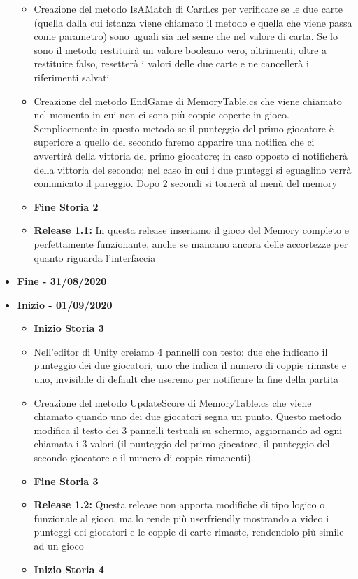 \documentclass[12pt]{article}
\begin{document}
\begin{itemize}
\begin{itemize}
	\item Creazione del metodo IsAMatch di Card.cs per verificare se le due carte (quella dalla cui istanza viene chiamato il metodo e quella che viene passa come parametro) sono uguali sia nel seme che nel valore di carta. Se lo sono il metodo restituirà un valore booleano vero, altrimenti, oltre a restituire falso, resetterà i valori delle due carte e ne cancellerà i riferimenti salvati
	\item Creazione del metodo EndGame di MemoryTable.cs che viene chiamato nel momento in cui non ci sono più coppie coperte in gioco. Semplicemente in questo metodo se il punteggio del primo giocatore è superiore a quello del secondo faremo apparire una notifica che ci avvertirà della vittoria del primo giocatore; in caso opposto ci notificherà della vittoria del secondo; nel caso in cui i due punteggi si eguaglino verrà comunicato il pareggio. Dopo 2 secondi si tornerà al menù del memory
	\item \textbf{Fine Storia 2}
	\item \textbf{Release 1.1:} In questa release inseriamo il gioco del Memory completo e perfettamente funzionante, anche se mancano ancora delle accortezze per quanto riguarda l'interfaccia
	\end{itemize}
\item \textbf{Fine - 31/08/2020}
\item \textbf{Inizio - 01/09/2020}
	\begin{itemize}
	\item \textbf{Inizio Storia 3}
	\item Nell'editor di Unity creiamo 4 pannelli con testo: due che indicano il punteggio dei due giocatori, uno che indica il numero di coppie rimaste e uno, invisibile di default che useremo per notificare la fine della partita
	\item Creazione del metodo UpdateScore di MemoryTable.cs che viene chiamato quando uno dei due giocatori segna un punto. Questo metodo modifica il testo dei 3 pannelli testuali su schermo, aggiornando ad ogni chiamata i 3 valori (il punteggio del primo giocatore, il punteggio del secondo giocatore e il numero di coppie rimanenti).
	\item \textbf{Fine Storia 3}
	\item \textbf{Release 1.2:} Questa release non apporta modifiche di tipo logico o funzionale al gioco, ma lo rende più userfriendly mostrando a video i punteggi dei giocatori e le coppie di carte rimaste, rendendolo più simile ad un gioco
	\item \textbf{Inizio Storia 4}

\end{itemize}
\end{itemize}
\end{document}
